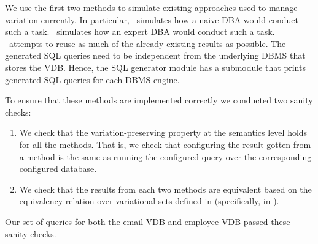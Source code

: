 \begin{enumerate}
\begin{example}
\end{example}
%
\end{enumerate}

We use the first two methods
to simulate existing approaches used to manage
variation currently. In particular, \nbf\ simulates how a naive
DBA would conduct such a task. \ubf\ simulates
how an expert DBA would conduct such a task. 
\uav\ attempts to reuse as much of the already existing results as possible. 
%
The generated SQL queries need to be independent from the 
underlying DBMS that stores the VDB. Hence, the SQL generator module
has a submodule that prints generated SQL queries for each DBMS engine. 


To ensure that these methods are implemented correctly we conducted two
sanity checks:
\begin{enumerate}
\item We check that the variation-preserving property at the semantics level
holds for all the methods. That is, we check that configuring the result gotten from
a method is the same as running the configured query over the corresponding 
configured database.
%
\item We check that the results from each two methods are equivalent based on
the equivalency relation over variational sets defined in  
(specifically, in ).
\end{enumerate}

Our set of queries for both the email VDB and employee VDB passed these sanity checks.
